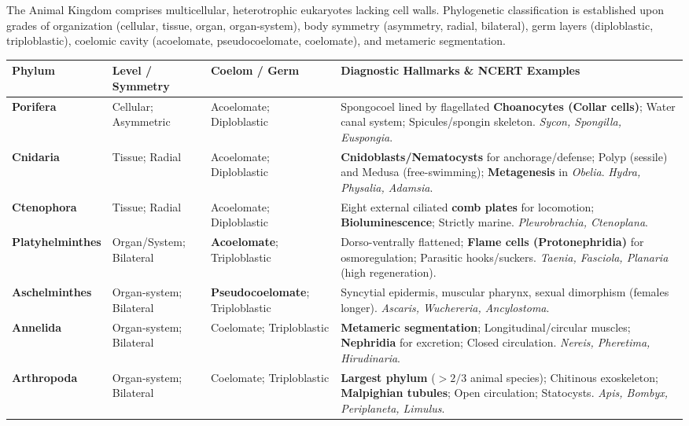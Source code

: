 \documentclass[10pt,twoside,openright]{book}
\begin{document}
The Animal Kingdom comprises multicellular, heterotrophic eukaryotes lacking cell walls. Phylogenetic classification is established upon grades of organization (cellular, tissue, organ, organ-system), body symmetry (asymmetry, radial, bilateral), germ layers (diploblastic, triploblastic), coelomic cavity (acoelomate, pseudocoelomate, coelomate), and metameric segmentation.

\begin{table}[htbp]
\centering
\scriptsize
\setlength{\tabcolsep}{2pt}
\renewcommand{\arraystretch}{1.15}
\begin{tabularx}{\textwidth}{l >{\RaggedRight}p{1.9cm} >{\RaggedRight}p{2.6cm} >{\RaggedRight}X}
\toprule
\textbf{Phylum} & \textbf{Level / Symmetry} & \textbf{Coelom / Germ} & \textbf{Diagnostic Hallmarks \& NCERT Examples} \\
\midrule
\textbf{Porifera} & Cellular; Asymmetric & Acoelomate; Diploblastic & Spongocoel lined by flagellated \textbf{Choanocytes (Collar cells)}; Water canal system; Spicules/spongin skeleton. \textit{Sycon, Spongilla, Euspongia}. \\
\textbf{Cnidaria} & Tissue; Radial & Acoelomate; Diploblastic & \textbf{Cnidoblasts/Nematocysts} for anchorage/defense; Polyp (sessile) and Medusa (free-swimming); \textbf{Metagenesis} in \textit{Obelia}. \textit{Hydra, Physalia, Adamsia}. \\
\textbf{Ctenophora} & Tissue; Radial & Acoelomate; Diploblastic & Eight external ciliated \textbf{comb plates} for locomotion; \textbf{Bioluminescence}; Strictly marine. \textit{Pleurobrachia, Ctenoplana}. \\
\textbf{Platyhelminthes} & Organ/System; Bilateral & \textbf{Acoelomate}; Triploblastic & Dorso-ventrally flattened; \textbf{Flame cells (Protonephridia)} for osmoregulation; Parasitic hooks/suckers. \textit{Taenia, Fasciola, Planaria} (high regeneration). \\
\textbf{Aschelminthes} & Organ-system; Bilateral & \textbf{Pseudo\-coelomate}; Triploblastic & Syncytial epidermis, muscular pharynx, sexual dimorphism (females longer). \textit{Ascaris, Wuchereria, Ancylostoma}. \\
\textbf{Annelida} & Organ-system; Bilateral & Coelomate; Triploblastic & \textbf{Metameric segmentation}; Longitudinal/circular muscles; \textbf{Nephridia} for excretion; Closed circulation. \textit{Nereis, Pheretima, Hirudinaria}. \\
\textbf{Arthropoda} & Organ-system; Bilateral & Coelomate; Triploblastic & \textbf{Largest phylum} ($>2/3$ animal species); Chitinous exoskeleton; \textbf{Malpighian tubules}; Open circulation; Statocysts. \textit{Apis, Bombyx, Periplaneta, Limulus}. \\

\end{tabularx}
\end{table}
\end{document}
